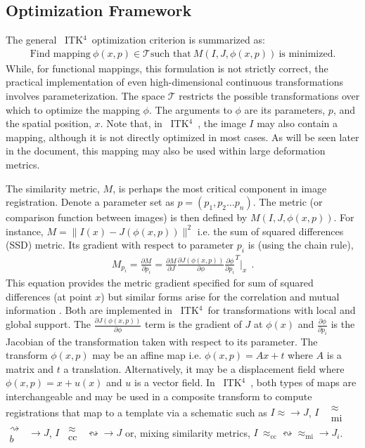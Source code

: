 \documentclass{frontiersSCNS}
\newcommand{\bsp}{$\substack{
   \rightsquigarrow \\
   b
  }$}
\newcommand{\mi}{$\substack{
   \approx \\
   \text{mi}
  }$}
\newcommand{\cc}{$\substack{
   \approx \\
   \text{cc}
  }$}
\newcommand{\tk}{~ITK$^{\text{4}}$~}
\begin{document}
\subsection{Optimization Framework}
The general \tk optimization criterion is summarized as:
\begin{eqnarray}
\text{Find mapping}~\phi(x,p) \in \mathcal{T}
\text{such that}~M(I,J,\phi(x,p))~\text{is minimized}. 
\label{eq:gen}
\end{eqnarray}
While, for functional mappings, this formulation is not strictly correct, the
practical implementation of even high-dimensional continuous
transformations involves parameterization. 
The space $\mathcal{T}$ restricts the possible transformations over
which to optimize the mapping $\phi$.  The arguments to $\phi$ are its
parameters, $p$, and the spatial position, $x$.  Note that, in \tk,
the image $I$ may also contain a mapping, although it is not directly
optimized in most cases.  As will be seen later in the document, this
mapping may also be used within large deformation metrics. 

The similarity metric, $M$, is perhaps the most critical component in image registration.  
Denote a parameter set as $p = (p_1, p_2 \ldots p_n)$.  
The metric (or comparison function between images) is then defined by $M(I,J,\phi(x,p))$.  For instance, $M=\|
I(x)-J(\phi(x,p)) \|^2$ i.e. the sum of squared differences (SSD) metric. Its gradient with respect to parameter $p_i$
is (using the chain rule), 
\begin{eqnarray}
 M_{p_i}=\frac{\partial M}{\partial
  p_i}=\frac{\partial M}{\partial J}\frac{\partial
  J(\phi(x,p))}{\partial \phi} \frac{\partial \phi}{\partial p_i}^T|_x
~~.
\label{eq:grad}
\end{eqnarray}
This equation provides the metric gradient specified for
sum of squared differences (at point $x$) but similar forms arise for the correlation
and mutual information \cite{hermosillo}.  Both are implemented in
\tk for transformations with local and global support.  The
$\frac{\partial J(\phi(x,p))}{\partial \phi}$ term is the gradient of $J$ at $\phi(x)$
and $\frac{\partial \phi}{\partial p_i}$ is the Jacobian of the transformation taken
with respect to its parameter.   The transform $\phi(x,p)$ may be
an affine map i.e. $\phi(x,p)=A x + t$ where $A$ is a matrix and
$t$ a translation.  Alternatively, it may be a displacement field
where $\phi(x,p)=x+u(x)$ and
$u$ is a vector field.  In \tk, both types of maps are interchangeable
and may be used in a composite transform to compute registrations that
map to a template via a schematic such as $ I \approx \rightarrow J $, $ I $ ~\mi~\bsp~$
\rightarrow  J $, $ I $~\cc~$ \leftrightsquigarrow \rightarrow J $
or, mixing similarity metrics, $I
~\approx_\text{cc}  \leftrightsquigarrow \approx_\text{mi}  \rightarrow
J_i $.  
\end{document}
